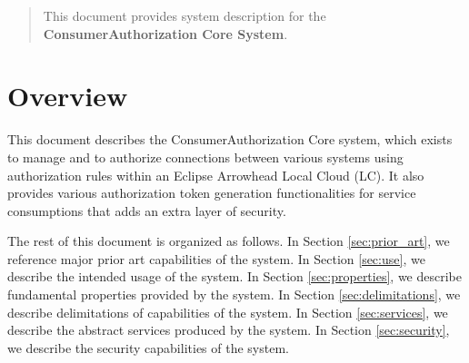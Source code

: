 \documentclass[a4paper]{arrowhead}
\begin{document}
\ArrowheadDate{\today}
\ArrowheadSetup

\begin{center}
  \vspace*{1cm}
  \huge{\arrowtitle}

  \vspace*{0.2cm}
  \LARGE{\arrowtype}
  \vspace*{1cm}

  \vspace*{\fill}


  \vspace*{1cm}
  \vspace*{\fill}

  \begin{abstract}
    This document provides system description for the \textbf{ConsumerAuthorization Core System}.
  \end{abstract}

  \vspace*{1cm}

 \end{center}

\newpage

\tableofcontents
\newpage

\section{Overview}
\label{sec:overview}
\color{black}
This document describes the ConsumerAuthorization Core system, which exists to manage and to authorize connections between various systems using authorization rules within an Eclipse Arrowhead Local Cloud (LC). It also provides various authorization token generation functionalities for service consumptions that adds an extra layer of security.

The rest of this document is organized as follows.
In Section \ref{sec:prior_art}, we reference major prior art capabilities
of the system.
In Section \ref{sec:use}, we describe the intended usage of the system.
In Section \ref{sec:properties}, we describe fundamental properties
provided by the system.
In Section \ref{sec:delimitations}, we describe delimitations of capabilities
of the system.
In Section \ref{sec:services}, we describe the abstract services produced by the system.
In Section \ref{sec:security}, we describe the security capabilities
of the system.
\end{document}
